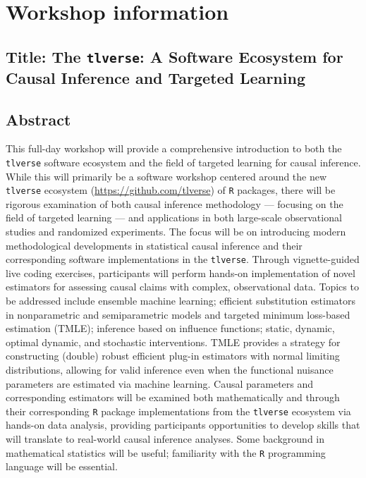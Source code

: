 \documentclass[a4paper,11pt]{texMemo}
\begin{document}
\maketitle
\vspace{-0.25in}
\section{Workshop information}

\subsection{\textbf{Title:} \small The \texttt{tlverse}: A Software Ecosystem
  for Causal Inference and Targeted Learning}

\subsection{Abstract}

This full-day workshop will provide a comprehensive introduction to both the
\texttt{tlverse} software ecosystem and the field of targeted learning for
causal inference. While this will primarily be a software workshop centered
around the new \texttt{tlverse} ecosystem (\url{https://github.com/tlverse}) of
\texttt{R} packages, there will be rigorous examination of both causal inference
methodology --- focusing on the field of targeted learning --- and applications
in both large-scale observational studies and randomized experiments. The focus
will be on introducing modern methodological developments in statistical causal
inference and their corresponding software implementations in the
\texttt{tlverse}. Through vignette-guided live coding exercises, participants
will perform hands-on implementation of novel estimators for assessing causal
claims with complex, observational data. Topics to be addressed include ensemble
machine learning; efficient substitution estimators in nonparametric and
semiparametric models and targeted minimum loss-based estimation (TMLE);
inference based on influence functions; static, dynamic, optimal dynamic, and
stochastic interventions. TMLE provides a strategy for constructing (double)
robust efficient plug-in estimators with normal limiting distributions, allowing
for valid inference even when the functional nuisance parameters are estimated
via machine learning. Causal parameters and corresponding estimators will be
examined both mathematically and through their corresponding \texttt{R} package
implementations from the \texttt{tlverse} ecosystem via hands-on data analysis,
providing participants opportunities to develop skills that will translate to
real-world causal inference analyses. Some background in mathematical statistics
will be useful; familiarity with the \texttt{R} programming language will be
essential.
\end{document}
